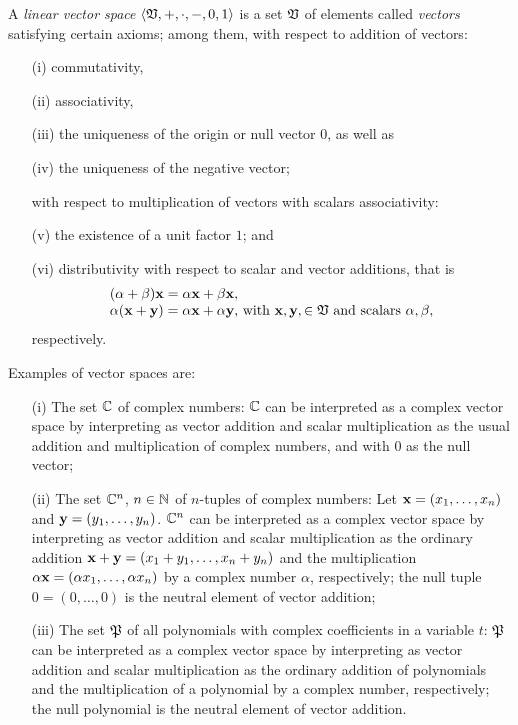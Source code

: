A {\em linear vector space}      $\langle  \frak V , +, \cdot , -,  0, 1\rangle$
is a set $\frak V$ of elements called {\em vectors}
satisfying certain axioms; among them,
with respect to addition of vectors:
\begin{itemize}
\item[(i)]
commutativity,

\item[(ii)]associativity,

\item[(iii)]
the uniqueness of the origin or null vector $0$,
as well as
\item[(iv)]
the uniqueness of  the negative vector;
\item[ ]
with respect to multiplication of vectors with scalars associativity:
\item[(v)]
the existence of a unit factor $1$; and
\item[(vi)]
distributivity with respect to scalar and vector additions, that is
\begin{equation}
\begin{array}{l}
(\alpha +\beta ){\bf x}
=   \alpha {\bf x}+\beta  {\bf x}, \\
\alpha ({\bf x} +{\bf y})
=   \alpha {\bf x}+\alpha {\bf y}$, with ${\bf x}, {\bf y},
\in \frak V$ and scalars $\alpha ,\beta,
\end{array}
\end{equation}
respectively.
\end{itemize}

{
\color{blue}
\bexample
Examples of vector spaces are:
\begin{itemize}
\item[(i)]
The set ${\Bbb C}$ of complex numbers: ${\Bbb C}$  can be interpreted as a complex vector space by  interpreting as vector addition and scalar multiplication
as the usual addition and multiplication of complex numbers, and with $0$ as the null vector;
\item[(ii)]
The set ${\Bbb C}^n$, $n \in {\Bbb N}$ of $n$-tuples of complex numbers:
Let
${\bf x}=
(x_1,\ldots , x_n)$
and
${\bf y}=
(y_1,\ldots , y_n)$.
 ${\Bbb C}^n$  can be interpreted as a complex vector space by  interpreting as vector addition
 and scalar multiplication
as the ordinary addition  $ {\bf x} + {\bf y} =  (x_1+y_1,\ldots , x_n+y_n)$
and the multiplication $\alpha {\bf x}=
(\alpha  x_1,\ldots ,\alpha  x_n)$ by a complex number $\alpha$, respectively;
the null tuple $0 =
(0,\ldots ,0)$ is the neutral element of vector addition;
\item[(iii)]
The set ${\frak P}$
 of all polynomials with complex coefficients in a variable $t$:
${\frak P}$  can be interpreted as a complex vector space by  interpreting as vector addition and scalar multiplication
as the ordinary addition of polynomials and the multiplication of a polynomial by a complex number, respectively;
the null polynomial is the neutral element of vector addition.  \eexample
\end{itemize}
}


